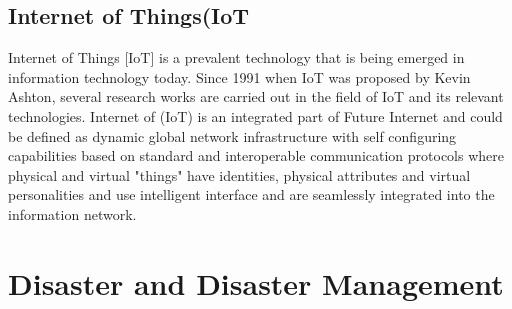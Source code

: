 \subsection{Internet of Things(IoT}
Internet of Things [IoT] is a prevalent technology that is being emerged in information technology today. Since 1991 when IoT was proposed by Kevin Ashton, several research works are carried out in the field of IoT and its relevant technologies. Internet of (IoT) is an integrated part of Future Internet and could be defined as dynamic global network infrastructure with self configuring capabilities based on standard and interoperable communication protocols where physical and virtual "things" have identities, physical attributes and virtual personalities and use intelligent interface and are seamlessly integrated into the information network\cite{IoTDefinition}.

\section{Disaster and Disaster Management}
\vspace{-0.5cm}
